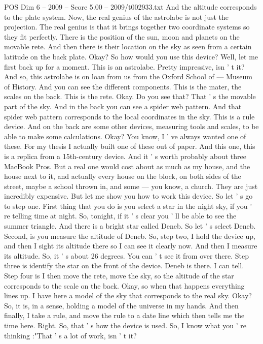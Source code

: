 \begin{textsample}{POS Dim 6 – 2009 – Score 5.00 – 2009/t002933.txt}
And the altitude corresponds to the plate system.
Now, the real genius of the astrolabe is not just the projection.
The real genius is that it brings together two coordinate systems so they fit perfectly.
There is the position of the sun, moon and planets on the movable rete.
And then there is their location on the sky as seen from a certain latitude on the back plate.
Okay?
So how would you use this device?
Well, let me first back up for a moment.
This is an astrolabe.
Pretty impressive, isn ' t it?
And so, this astrolabe is on loan from us from the Oxford School of — Museum of History.
And you can see the different components.
This is the mater, the scales on the back.
This is the rete.
Okay.
Do you see that?
That ' s the movable part of the sky.
And in the back you can see a spider web pattern.
And that spider web pattern corresponds to the local coordinates in the sky.
This is a rule device.
And on the back are some other devices, measuring tools and scales, to be able to make some calculations.
Okay?
You know, I ' ve always wanted one of these.
For my thesis I actually built one of these out of paper.
And this one, this is a replica from a 15th-century device.
And it ' s worth probably about three MacBook Pros.
But a real one would cost about as much as my house, and the house next to it, and actually every house on the block, on both sides of the street, maybe a school thrown in, and some — you know, a church.
They are just incredibly expensive.
But let me show you how to work this device.
So let ' s go to step one.
First thing that you do is you select a star in the night sky, if you ' re telling time at night.
So, tonight, if it ' s clear you ' ll be able to see the summer triangle.
And there is a bright star called Deneb.
So let ' s select Deneb.
Second, is you measure the altitude of Deneb.
So, step two, I hold the device up, and then I sight its altitude there so I can see it clearly now.
And then I measure its altitude.
So, it ' s about 26 degrees.
You can ' t see it from over there.
Step three is identify the star on the front of the device.
Deneb is there.
I can tell.
Step four is I then move the rete, move the sky, so the altitude of the star corresponds to the scale on the back.
Okay, so when that happens everything lines up.
I have here a model of the sky that corresponds to the real sky.
Okay?
So, it is, in a sense, holding a model of the universe in my hands.
And then finally, I take a rule, and move the rule to a date line which then tells me the time here.
Right.
So, that ' s how the device is used.
So, I know what you ' re thinking :"That ' s a lot of work, isn ' t it?

\end{textsample}
